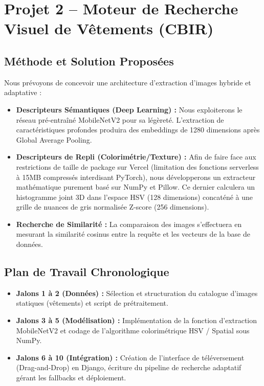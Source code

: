 \documentclass[12pt,a4paper]{article}
\begin{document}
\newpage

\section{Projet 2 -- Moteur de Recherche Visuel de Vêtements (CBIR)}

\subsection{Méthode et Solution Proposées}
Nous prévoyons de concevoir une architecture d'extraction d'images hybride et adaptative :
\begin{itemize}
    \item \textbf{Descripteurs Sémantiques (Deep Learning) :} Nous exploiterons le réseau pré-entraîné MobileNetV2 pour sa légèreté. L'extraction de caractéristiques profondes produira des embeddings de 1280 dimensions après Global Average Pooling.
    \item \textbf{Descripteurs de Repli (Colorimétrie/Texture) :} Afin de faire face aux restrictions de taille de package sur Vercel (limitation des fonctions serverless à 15MB compressés interdisant PyTorch), nous développerons un extracteur mathématique purement basé sur NumPy et Pillow. Ce dernier calculera un histogramme joint 3D dans l'espace HSV (128 dimensions) concaténé à une grille de nuances de gris normalisée Z-score (256 dimensions).
    \item \textbf{Recherche de Similarité :} La comparaison des images s'effectuera en mesurant la similarité cosinus entre la requête et les vecteurs de la base de données.
\end{itemize}

\subsection{Plan de Travail Chronologique}
\begin{itemize}
    \item \textbf{Jalons 1 à 2 (Données) :} Sélection et structuration du catalogue d'images statiques (vêtements) et script de prétraitement.
    \item \textbf{Jalons 3 à 5 (Modélisation) :} Implémentation de la fonction d'extraction MobileNetV2 et codage de l'algorithme colorimétrique HSV / Spatial sous NumPy.
    \item \textbf{Jalons 6 à 10 (Intégration) :} Création de l'interface de téléversement (Drag-and-Drop) en Django, écriture du pipeline de recherche adaptatif gérant les fallbacks et déploiement.
\end{itemize}
\end{document}
